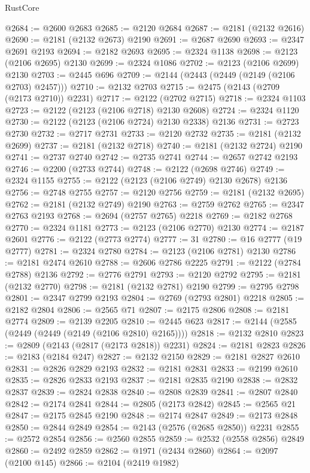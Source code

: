 \begin{lexlean}{RustCore}
\begin{coremodule}
@2684 := @2600 @2683
@2685 := @2120 @2684
@2687 := @2181 (@2132 @2616)
@2690 := @2181 (@2132 @2673) @2190
@2691 := @2687 @2690
@2693 := @2347 @2691 @2193
@2694 := @2182 @2693
@2695 := @2324 @1138
@2698 := @2123 (@2106 @2695) @2130
@2699 := @2324 @1086
@2702 := @2123 (@2106 @2699) @2130
@2703 := @2445 @696
@2709 := @2144 (@2443 (@2449 (@2149 (@2106 @2703) @2457)))
@2710 := @2132 @2703
@2715 := @2475 (@2143 (@2709 (@2173 @2710)) @2231)
@2717 := @2122 (@2702 @2715)
@2718 := @2324 @1103
@2723 := @2122 (@2123 (@2106 @2718) @2130 @2608)
@2724 := @2324 @1120
@2730 := @2122 (@2123 (@2106 @2724) @2130 @2338) @2136
@2731 := @2723 @2730
@2732 := @2717 @2731
@2733 := @2120 @2732
@2735 := @2181 (@2132 @2699)
@2737 := @2181 (@2132 @2718)
@2740 := @2181 (@2132 @2724) @2190
@2741 := @2737 @2740
@2742 := @2735 @2741
@2744 := @2657 @2742 @2193
@2746 := @2200 (@2733 @2744)
@2748 := @2122 (@2698 @2746)
@2749 := @2324 @1155
@2755 := @2122 (@2123 (@2106 @2749) @2130 @2678) @2136
@2756 := @2748 @2755
@2757 := @2120 @2756
@2759 := @2181 (@2132 @2695)
@2762 := @2181 (@2132 @2749) @2190
@2763 := @2759 @2762
@2765 := @2347 @2763 @2193
@2768 := @2694 (@2757 @2765) @2218
@2769 := @2182 @2768
@2770 := @2324 @1181
@2773 := @2123 (@2106 @2770) @2130
@2774 := @2187 @2601
@2776 := @2122 (@2773 @2774)
@2777 := 31
@2780 := @16 @2777 (@19 @2777)
@2781 := @2324 @2780
@2784 := @2123 (@2106 @2781) @2130
@2786 := @2181 @2474 @2610
@2788 := @2606 @2786 @2225
@2791 := @2122 (@2784 @2788) @2136
@2792 := @2776 @2791
@2793 := @2120 @2792
@2795 := @2181 (@2132 @2770)
@2798 := @2181 (@2132 @2781) @2190
@2799 := @2795 @2798
@2801 := @2347 @2799 @2193
@2804 := @2769 (@2793 @2801) @2218
@2805 := @2182 @2804
@2806 := @2565 @71
@2807 := @2175 @2806
@2808 := @2181 @2774
@2809 := @2139 @2205
@2810 := @2445 @623
@2817 := @2144 (@2585 (@2449 (@2449 (@2149 (@2106 @2810) @2165))))
@2818 := @2132 @2810
@2823 := @2809 (@2143 (@2817 (@2173 @2818)) @2231)
@2824 := @2181 @2823
@2826 := @2183 (@2184 @247)
@2827 := @2132 @2150
@2829 := @2181 @2827 @2610
@2831 := @2826 @2829 @2193
@2832 := @2181 @2831
@2833 := @2199 @2610
@2835 := @2826 @2833 @2193
@2837 := @2181 @2835 @2190
@2838 := @2832 @2837
@2839 := @2824 @2838
@2840 := @2808 @2839
@2841 := @2807 @2840
@2842 := @2174 @2841
@2844 := @2805 (@2173 @2842)
@2845 := @2565 @21
@2847 := @2175 @2845 @2190
@2848 := @2174 @2847
@2849 := @2173 @2848
@2850 := @2844 @2849
@2854 := @2143 (@2576 (@2685 @2850)) @2231
@2855 := @2572 @2854
@2856 := @2560 @2855
@2859 := @2532 (@2558 @2856) @2849
@2860 := @2492 @2859
@2862 := @1971 (@2434 @2860)
@2864 := @2097 (@2100 @145)
@2866 := @2104 (@2419 @1982)

\end{coremodule}
\end{lexlean}
